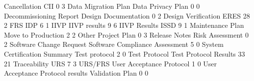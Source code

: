 \documentclass{article}
\begin{document}
\begin{Schunk}
\begin{Soutput}
                    Cancellation                              CII 
                               0                                3 
             Data Migration Plan                Data Privacy Plan 
                               0                                0 
          Decommissioning Report             Design Documentation 
                               0                                2 
             Design Verification                             ERES 
                              28                                2 
                             FRS                              IDP 
                               6                                1 
                            IIVP                     IIVP results 
                               9                                6 
                    IIVP Results                             ISSD 
                               9                                1 
                Maintenance Plan               Move to Production 
                               2                                2 
                           Other                     Project Plan 
                               0                                3 
                   Release Notes                  Risk Assessment 
                               0                                2 
         Software Change Request   Software Compliance Assessment 
                               5                                0 
    System Certification Summary                    Test protocol 
                               2                                0 
                   Test Protocol            Test Protocol Results 
                              33                               21 
                    Traceability                              URS 
                               7                                3 
                         URS/FRS         User Acceptance Protocol 
                               1                                0 
User Acceptance Protocol results                  Validation Plan 
                               0                                0 
\end{Soutput}
\end{Schunk}
\end{document}
